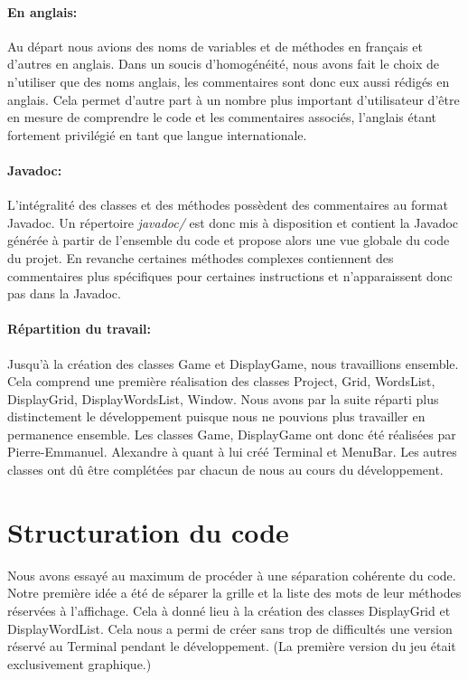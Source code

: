 \documentclass{article}
\begin{document}
\paragraph{En anglais:} Au départ nous avions des noms de variables et de méthodes en français et d'autres en anglais. Dans un soucis d'homogénéité, nous avons fait le choix de n'utiliser que des noms anglais, les commentaires sont donc eux aussi rédigés en anglais. Cela permet d'autre part à un nombre plus important d'utilisateur d'être en mesure de comprendre le code et les commentaires associés, l'anglais étant fortement privilégié en tant que langue internationale.

\paragraph{Javadoc:} L'intégralité des classes et des méthodes possèdent des commentaires au format Javadoc. Un répertoire \textit{javadoc/} est donc mis à disposition et contient la Javadoc générée à partir de l'ensemble du code et propose alors une vue globale du code du projet. En revanche certaines méthodes complexes contiennent des commentaires plus spécifiques pour certaines instructions et n'apparaissent donc pas dans la Javadoc.

\paragraph{Répartition du travail:} Jusqu'à la création des classes Game et DisplayGame, nous travaillions ensemble. Cela comprend une première réalisation des classes Project, Grid, WordsList, DisplayGrid, DisplayWordsList, Window. Nous avons par la suite réparti plus distinctement le développement puisque nous ne pouvions plus travailler en permanence ensemble. Les classes Game, DisplayGame ont donc été réalisées par Pierre-Emmanuel. Alexandre à quant à lui créé Terminal et MenuBar. Les autres classes ont dû être complétées par chacun de nous au cours du développement.



\section{Structuration du code}

Nous avons essayé au maximum de procéder à une séparation cohérente du code. Notre première idée a été de séparer la grille et la liste des mots de leur méthodes réservées à l'affichage. Cela à donné lieu à la création des classes DisplayGrid et DisplayWordList.
Cela nous a permi de créer sans trop de difficultés une version réservé au Terminal pendant le développement. (La première version du jeu était exclusivement graphique.)
\end{document}
